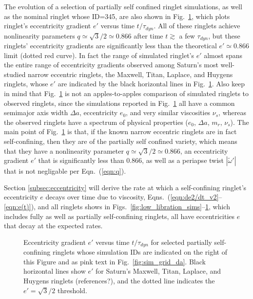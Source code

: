 \documentclass[preprint]{aastex62}
\begin{document}
The evolution of
a selection of partially self confined ringlet simulations, as well as the nominal ringlet whose ID=345, 
are also shown in Fig.\ \ref{fig:e_prime_q_vs_time},
which plots ringlet's eccentricity gradient $e'$ versus time $t/\tau_{dyn}$. All of these ringlets
achieve nonlinearity parameters $q\simeq\sqrt{3}/2\simeq0.866$ after time $t\gtrsim$ a few $\tau_{dyn}$, 
but these ringlets' eccentricity gradients are significantly less than the theoretical 
$e'\simeq0.866$ limit (dotted red curve). In fact the range of simulated ringlet's $e'$ almost spans the entire 
range of eccentricity gradients observed among Saturn's most well-studied narrow eccentric
ringlets, the Maxwell, Titan, Laplace, and Huygens ringlets, whose $e'$ are
indicated by the black horizontal lines in Fig.\ \ref{fig:e_prime_q_vs_time}. Also keep in mind that
Fig.\ \ref{fig:e_prime_q_vs_time} is not an apples-to-apples comparison of simulated ringlets to 
observed ringlets, since the simulations reported in Fig.\ \ref{fig:e_prime_q_vs_time} all have a common 
semimajor axis width $\Delta a$, eccentricity $e_0$,  and very similar viscosities $\nu_s$,
whereas the observed ringlets have a spectrum of physical properties ($e_0$, $\Delta a$, $m_r$, $\nu_s$).
The main point of Fig.\ \ref{fig:e_prime_q_vs_time} is that, if the known narrow eccentric
ringlets are in fact self-confining, then they are of the partially self confined variety,
which means that they have a nonlinearity parameter $q\simeq\sqrt{3}/2\simeq0.866$, an eccentricity gradient
$e'$ that is significantly less than $0.866$, as well as a periapse twist $|\tilde{\omega}'|$ that is not
negligable per Eqn.\ (\ref{eqn:q}). 

Section \ref{subsec:eccentricity} will derive the rate at which
a self-confining ringlet's eccentricity $e$ decays over time due to viscosity, Eqns.\ (\ref{eqn:de2/dt_v2}--\ref{eqn:e(t)}),
and all ringlets shows in Figs.\ \ref{fig:low_libration_sims}--\ref{fig:e_prime_q_vs_time},
which includes fully as well as partially self-confining ringlets, all have eccentricities $e$
that decay at the expected rates.
\begin{figure}
    \caption{
        \label{fig:e_prime_q_vs_time}
        Eccentricity gradient $e'$ versus time $t/\tau_{dyn}$ for selected partially self-confining
        ringlets whose simulation IDs are indicated on the right of this Figure and
        as pink text in Fig.\ \ref{fig:sim_grid_da}.
        Black horizontal lines show $e'$ for Saturn's Maxwell, Titan, Laplace, and Huygens ringlets
        (references?), and the dotted line indicates the $e'=\sqrt{3}/2$ threshold.
    }
\end{figure}
\end{document}
